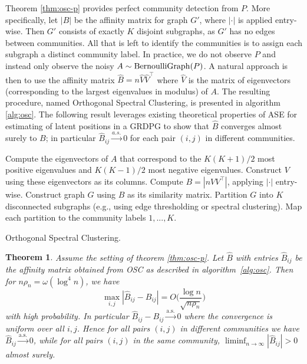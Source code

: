 \documentclass[
  12pt,
]{article}
\newtheorem{theorem}{Theorem}[section]
\theoremstyle{definition}
\theoremstyle{definition}
\theoremstyle{definition}
\theoremstyle{definition}
\theoremstyle{remark}
\begin{document}
Theorem \ref{thm:osc-p} provides perfect community detection from \(P\).
More specifically, let \(|B|\) be the affinity matrix for graph \(G'\),
where \(|\cdot|\) is applied entry-wise. Then
\(G'\) consists of exactly \(K\) disjoint subgraphs,
as \(G'\) has no edges between communities.
All that is left to identify the communities is
to assign each subgraph a distinct community label.
In practice, we do not observe \(P\) and instead only observe the noisy
\(A \sim \mathrm{BernoulliGraph}(P)\). A natural approach is then to use
the affinity matrix \(\hat{B} = n \hat{V} \hat{V}^{\top}\) where
\(\hat{V}\) is the matrix of eigenvectors (corresponding to the largest
eigenvalues in modulus) of \(A\). The resulting procedure, named
Orthogonal Spectral Clustering, is presented in
algorithm \ref{alg:osc}.
The following result leverages existing theoretical properties
of ASE for estimating of latent positions in a GRDPG \citep{rubindelanchy2017statistical} to show that
\(\hat{B}\) converges almost surely to \(B\); in particular
\(\hat{B}_{ij} \stackrel{a.s.}{\to} 0\)
for each pair \((i, j)\) in different communities.

\begin{algorithm}[tp]
\label{alg:osc}
\DontPrintSemicolon
\SetAlgoLined
{}
Compute the eigenvectors of $A$ that correspond to the $K (K+1) / 2$ most
positive eigenvalues and $K (K-1) / 2$ most negative eigenvalues. Construct
$V$ using these eigenvectors as its columns.\;
Compute $B = |n V V^\top|$, applying $|\cdot|$ entry-wise.\;
Construct graph $G$ using $B$ as its similarity matrix.\;
Partition $G$ into $K$ disconnected subgraphs
(e.g., using edge thresholding or spectral clustering).\;
Map each partition to the community labels $1, ..., K$.\;
\caption{Orthogonal Spectral Clustering.}
\end{algorithm}

\begin{theorem}
\label{thm:osc}
Assume the setting of theorem \ref{thm:osc-p}. 
Let $\hat{B}$ with entries $\hat{B}_{ij}$ be the affinity matrix
obtained from OSC as described in algorithm~\ref{alg:osc}. 
Then for $n \rho_n = \omega(\log^{4}{n})$, we have
\begin{equation} 
\label{eq:osc}
\max_{i, j} |\hat{B}_{ij} - B_{ij}| = O\Big( \frac{\log n}{\sqrt{n \rho_n}} \Big)
\end{equation}
with high probability. In particular 
$\hat{B}_{ij} -B_{ij} \overset{\mathrm{a.s.}}{\rightarrow} 0$ 
where the convergence is
uniform over all $i,j$. Hence for all pairs $(i,j)$ in different
communities we have 
$\hat{B}_{ij} \overset{\mathrm{a.s.}}{\rightarrow} 0$, 
while for all pairs $(i, j)$ in the same community, 
$\liminf_{n \to \infty} |\hat{B}_{ij}| > 0$ almost surely. 
\end{theorem}
\end{document}
